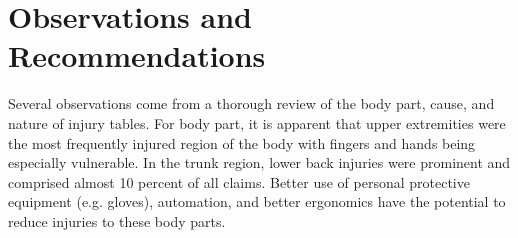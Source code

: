 \documentclass[9pt, oneside]{article}   	%
\begin{document}






\pagebreak


\section{Observations and Recommendations}

Several observations come from a thorough review of the body part, cause, and nature of injury tables. For body part, it is apparent that upper extremities were the most frequently injured region of the body with fingers and hands being especially vulnerable. In the trunk region, lower back injuries were prominent and comprised almost 10 percent of all claims. Better use of personal protective equipment (e.g. gloves), automation, and better ergonomics have the potential to reduce injuries to these body parts. 
\end{document}
